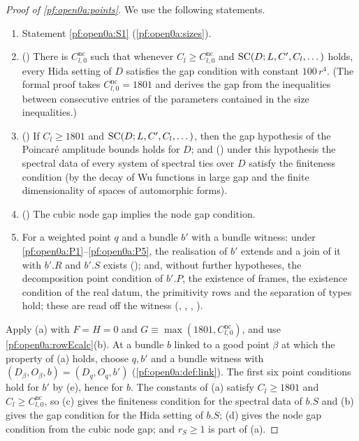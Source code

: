 \begin{proof}[Proof of \cref{pf:open0a:points}]
We use the following statements.
\begin{enumerate}[label=(\alph*)]
\item Statement \ref{pf:open0a:S1} (\cref{pf:open0a:sizes}).
\item () There is $C^{\mathrm{nc}}_{l,0}$ such that whenever
$C_l\ge C^{\mathrm{nc}}_{l,0}$ and $\mathrm{SC}(D;L,C',C_l,\dots)$ holds, every Hida setting of $D$ satisfies the gap
condition with constant $100\,r^4$. (The formal proof takes $C^{\mathrm{nc}}_{l,0}=1801$ and derives the gap from the
inequalities between consecutive entries of the parameters contained in the size inequalities.)
\item () If $C_l\ge1801$ and $\mathrm{SC}(D;L,C',C_l,\dots)$, then
the gap hypothesis of the Poincar\'e amplitude bounds holds for $D$; and
() under this hypothesis the spectral data of every system of spectral
ties over $D$ satisfy the finiteness condition (by the decay of Wu functions in large gap and the finite
dimensionality of spaces of automorphic forms).
\item () The cubic node gap
implies the node gap condition.
\item For a weighted point $q$ and a bundle $b'$ with a bundle witness: under \ref{pf:open0a:P1}--\ref{pf:open0a:P5},
the realisation of $b'$ extends and a join of it with $b'.R$ and $b'.S$ exists
(); and, without further hypotheses, the
decomposition point condition of $b'.P$, the existence of frames, the existence condition of the real datum, the
primitivity rows and the separation of types hold; these are read off the witness
(, ,
,
).
\end{enumerate}
Apply (a) with $F=H=0$ and $G\equiv\max(1801,C^{\mathrm{nc}}_{l,0})$, and use \cref{pf:open0a:rowEcalc}(b). At a bundle
$b$ linked to a good point $\beta$ at which the property of (a) holds, choose $q,b'$ and a bundle witness with
$(D_\beta,O_\beta,b)=(D_q,O_q,b')$ (\cref{pf:open0a:def:link}). The first six point conditions hold for $b'$ by (e),
hence for $b$. The constants of (a) satisfy $C_l\ge1801$ and $C_l\ge C^{\mathrm{nc}}_{l,0}$, so (c) gives the
finiteness condition for the spectral data of $b.S$ and (b) gives the gap condition for the Hida setting of $b.S$;
(d) gives the node gap condition from the cubic node gap; and $r_S\ge1$ is part of (a).
\end{proof}

